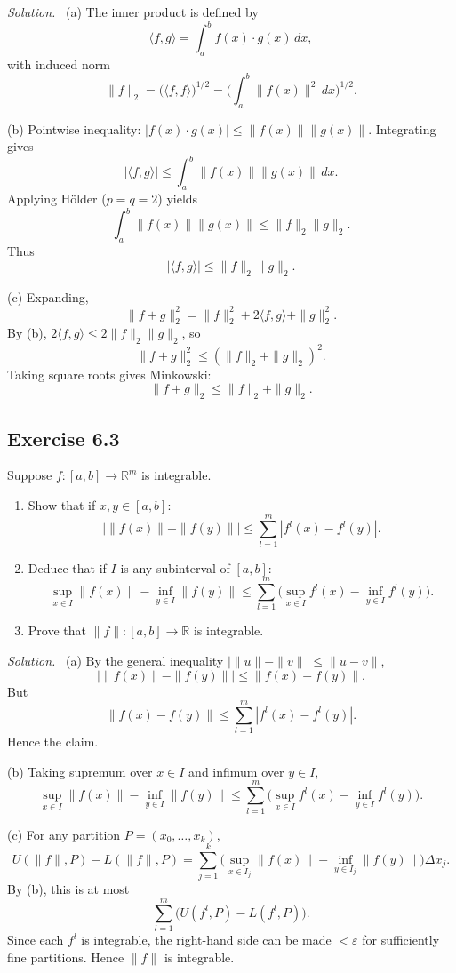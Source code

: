 \documentclass[11pt,a4paper]{article}
\newenvironment{solution}{\par\noindent\textit{Solution.}\ }{\par\vspace{0.5em}}
\begin{document}
\begin{solution}
	(a) The inner product is defined by
	\[
	\langle f,g\rangle = \int_a^b f(x)\cdot g(x)\,dx,
	\]
	with induced norm
	\[
	\|f\|_2 = \big(\langle f,f\rangle\big)^{1/2}
	=\Big(\int_a^b \|f(x)\|^2\,dx\Big)^{1/2}.
	\]
	
	(b) Pointwise inequality: $|f(x)\cdot g(x)| \leq \|f(x)\|\|g(x)\|$. 
	Integrating gives
	\[
	|\langle f,g\rangle| \leq \int_a^b \|f(x)\|\|g(x)\|\,dx.
	\]
	Applying Hölder ($p=q=2$) yields
	\[
	\int_a^b \|f(x)\|\|g(x)\| \leq \|f\|_2\|g\|_2.
	\]
	Thus
	\[
	|\langle f,g\rangle| \leq \|f\|_2\|g\|_2.
	\]
	
	(c) Expanding,
	\[
	\|f+g\|_2^2 = \|f\|_2^2 + 2\langle f,g\rangle + \|g\|_2^2.
	\]
	By (b), $2\langle f,g\rangle \leq 2\|f\|_2\|g\|_2$, so
	\[
	\|f+g\|_2^2 \leq (\|f\|_2+\|g\|_2)^2.
	\]
	Taking square roots gives Minkowski:
	\[
	\|f+g\|_2 \leq \|f\|_2+\|g\|_2.
	\]
\end{solution}

\subsection*{Exercise 6.3}
Suppose $f:[a,b]\to\mathbb{R}^m$ is integrable.

\begin{enumerate}[label=\alph*)]
	\item Show that if $x,y\in[a,b]$:
	\[
	|\|f(x)\|-\|f(y)\|| \leq \sum_{l=1}^m |f^l(x)-f^l(y)|.
	\]
	
	\item Deduce that if $I$ is any subinterval of $[a,b]$:
	\[
	\sup_{x\in I}\|f(x)\| - \inf_{y\in I}\|f(y)\|
	\leq \sum_{l=1}^m \Big(\sup_{x\in I} f^l(x) - \inf_{y\in I} f^l(y)\Big).
	\]
	
	\item Prove that $\|f\|:[a,b]\to\mathbb{R}$ is integrable.
\end{enumerate}

\begin{solution}
	(a) By the general inequality $|\|u\|-\|v\||\leq \|u-v\|$, 
	\[
	|\|f(x)\|-\|f(y)\|| \leq \|f(x)-f(y)\|.
	\]
	But
	\[
	\|f(x)-f(y)\| \leq \sum_{l=1}^m |f^l(x)-f^l(y)|.
	\]
	Hence the claim.
	
	(b) Taking supremum over $x\in I$ and infimum over $y\in I$, 
	\[
	\sup_{x\in I}\|f(x)\| - \inf_{y\in I}\|f(y)\|
	\leq \sum_{l=1}^m \big(\sup_{x\in I} f^l(x)-\inf_{y\in I} f^l(y)\big).
	\]
	
	(c) For any partition $P=(x_0,\dots,x_k)$,
	\[
	U(\|f\|,P)-L(\|f\|,P) = \sum_{j=1}^k \big(\sup_{x\in I_j}\|f(x)\|-\inf_{y\in I_j}\|f(y)\|\big)\Delta x_j.
	\]
	By (b), this is at most
	\[
	\sum_{l=1}^m \big(U(f^l,P)-L(f^l,P)\big).
	\]
	Since each $f^l$ is integrable, the right-hand side can be made $<\varepsilon$ 
	for sufficiently fine partitions. Hence $\|f\|$ is integrable.
\end{solution}
\end{document}
